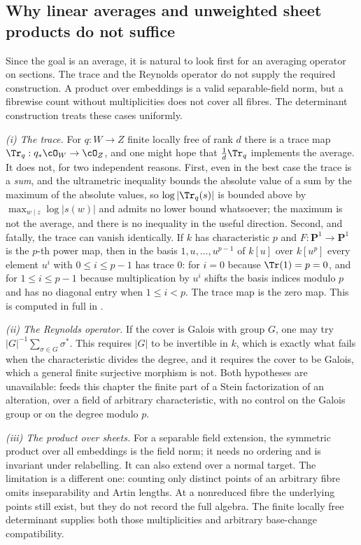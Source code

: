 \subsection{Why linear averages and unweighted sheet products do not suffice}
\label{sec:ch41-naive}

Since the goal is an average, it is natural to look first for an averaging
operator on sections.  The trace and the Reynolds operator do not supply the required
construction.  A product over embeddings is a valid separable-field norm,
but a fibrewise count without multiplicities does not cover all fibres.
The determinant construction treats these cases uniformly.

\emph{(i) The trace.}  For $q:W\to Z$ finite locally free of rank $d$
there is a trace map $\Tr_q:q_*\cO_W\to\cO_Z$, and one might hope that
$\frac1d\Tr_q$ implements the average.  It does not, for two independent
reasons.  First, even in the best case the trace is a \emph{sum}, and the
ultrametric inequality bounds the absolute value of a sum by the maximum of
the absolute values, so $\log|\Tr_q(s)|$ is bounded above by
$\max_{w\mid z}\log|s(w)|$ and admits no lower bound whatsoever; the
maximum is not the average, and there is no inequality in the useful
direction.  Second, and fatally, the trace can vanish identically.  If
$k$ has characteristic $p$ and $F:\mathbf P^1\to\mathbf P^1$ is the
$p$-th power map, then in the basis $1,u,\ldots,u^{p-1}$ of
$k[u]$ over $k[u^p]$ every element $u^i$ with $0\le i\le p-1$ has
trace $0$: for $i=0$ because $\Tr(1)=p=0$, and for $1\le i\le p-1$
because multiplication by $u^i$ shifts the basis indices modulo $p$
and has no diagonal entry when $1\le i<p$.  The trace map is the
zero map.  This is computed in full in .

\emph{(ii) The Reynolds operator.}  If the cover is Galois with group
$G$, one may try $|G|^{-1}\sum_{\sigma\in G}\sigma^*$.  This requires
$|G|$ to be invertible in $k$, which is exactly what fails when the
characteristic divides the degree, and it requires the cover to be Galois,
which a general finite surjective morphism is not.  Both hypotheses are
unavailable:  feeds this chapter the finite part
of a Stein factorization of an alteration, over a field of arbitrary
characteristic, with no control on the Galois group or on the degree modulo
$p$.

\emph{(iii) The product over sheets.}  For a separable field extension,
the symmetric product over all embeddings is the field norm; it needs
no ordering and is invariant under relabelling.  It can also extend
over a normal target.  The limitation is a different one: counting
only distinct points of an arbitrary fibre omits inseparability and
Artin lengths.  At a nonreduced fibre the underlying points still exist,
but they do not record the full algebra.  The finite locally free
determinant supplies both those multiplicities and arbitrary
base-change compatibility.

